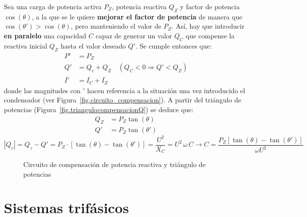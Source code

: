 \documentclass[11pt]{book} %
\numberwithin{dummy}{section}
\theoremstyle{ocrenumbox}
\theoremstyle{blacknumex}
\theoremstyle{blacknumbox}
\theoremstyle{ocrenum}
\newcommand{\thechapterimage}{}%
\newcommand{\chapterimage}[1]{\renewcommand{\thechapterimage}{#1}}%
\begin{document}
	Sea una carga de potencia activa $P_Z$, potencia reactiva $Q_Z$ y factor de potencia $\cos(\theta)$, a la que se le quiere \textbf{mejorar el factor de potencia} de manera que $\cos (\theta') > \cos (\theta)$, pero manteniendo el valor de $P_Z$. Así, hay que introducir \textbf{en paralelo} una capacidad $C$ capaz de generar un valor $Q_C$ que compense la reactiva inicial $Q_Z$ hasta el valor deseado $Q'$. Se cumple entonces que: 
	\begin{align*}
		P' &= P_Z\\
		Q' &= Q_c + Q_Z \quad (Q_C<0\Rightarrow Q' < Q_Z)\\
		\overline{I'} &= \overline{I_C} + \overline{I_Z}
	\end{align*}
	donde las magnitudes con $'$ hacen referencia a la situación una vez introducido el condensador (ver Figura~\ref{fig.circuito_compensacion}). A partir del triángulo de potencias (Figura~\ref{fig.triangulocompensacionQ}) se deduce que:
	\begin{align*}
		Q_Z &= P_Z \tan (\theta)\\
		Q'&= P_Z \tan (\theta')
	\end{align*}
	\begin{equation}
		|Q_c| = Q_z - Q' = P_Z\cdot \left[\tan (\theta) - \tan (\theta')\right]=\dfrac{U^2}{X_C}={U^2\,\omega\,C}\rightarrow \boxed{C=\frac{P_Z \left[\tan (\theta) - \tan (\theta')\right]}{\omega U^2}}
	\end{equation}
	
	
	\begin{figure}
		\centering
		\hfil
		\caption{Circuito de compensación de potencia reactiva y triángulo de potencias}
		\label{fig.circuitocompensacionreactiva}
	\end{figure}
	
	
	\chapterimage{imagen_t3.jpeg}
	\chapter{Sistemas trifásicos}
	
	
\end{document}
